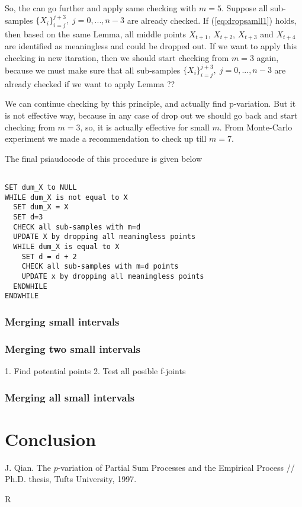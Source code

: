 \documentclass[12pt, a4paper]{article}
\numberwithin{equation}{section}
\begin{document}
So, the can go further and apply same checking with
$m=5$. Suppose all sub-samples
 $\{X_{i}\}_{i=j}^{j+3},\;j=0,...,n-3$ are already 
 checked.
 If (\ref{eq:dropsamll1}) holds, then based on
 the same Lemma, all middle points
$X_{t+1}$, $X_{t+2}$, $X_{t+3}$  and $X_{t+4}$ are  
identified as meaningless and could be dropped out.
If we want to apply this checking in new itaration,
then we should start checking from $m=3$ again, because
we must make sure that all sub-samples
 $\{X_{i}\}_{i=j}^{j+3},\;j=0,...,n-3$ are already 
 checked if we want to apply Lemma ??

We can continue checking by this principle, and actually find 
p-variation. But it is not effective way, because
in any case of drop out we should go back and start checking
from $m=3$, so, it is actually effective for small $m$. From Monte-Carlo experiment we made
a recommendation to check up till $m=7$.

The final psiaudocode of this procedure is given below
\begin{lstlisting}

SET dum_X to NULL
WHILE dum_X is not equal to X
  SET dum_X	= X
  SET d=3
  CHECK all sub-samples with m=d 
  UPDATE X by dropping all meaningless points
  WHILE dum_X is equal to X	
    SET d = d + 2
    CHECK all sub-samples with m=d points
    UPDATE x by dropping all meaningless points
  ENDWHILE  
ENDWHILE

\end{lstlisting}

\subsubsection{Merging small intervals}


\subsubsection{Merging two small intervals}

1. Find potential points 
2. Test all posible f-joints



\subsubsection{Merging all small intervals}



\section{Conclusion}
  
\begin{thebibliography}{99}  
   J. Qian. The $p$-variation of Partial Sum Processes
  and the Empirical Process // Ph.D. thesis, Tufts University, 1997.
  
    R
  
\end{thebibliography}
\end{document}

